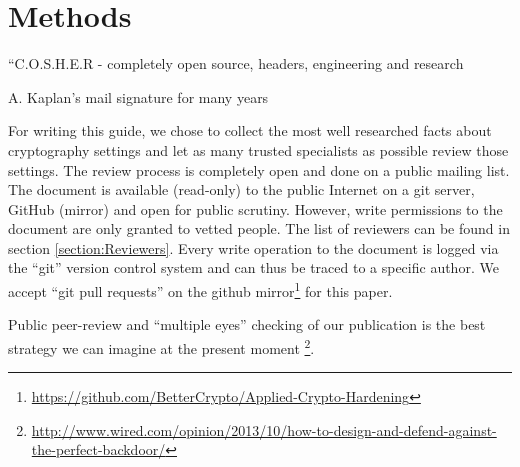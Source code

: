 \section{Methods}
\label{section:Methods}

\epigraph{``C.O.S.H.E.R - completely open source, headers, engineering and research}{A. Kaplan's mail signature for many years}

For writing this guide, we chose to collect the most well researched facts
about cryptography settings and let as many trusted specialists as possible
review those settings.  The review process is completely open and done on a
public mailing list. The document is available (read-only) to the public
Internet on a git server, GitHub (mirror) and open for public scrutiny.
However, write permissions to the document are only granted to vetted people.
The list of reviewers can be found in section \ref{section:Reviewers}.  Every
write operation to the document is logged via the ``git'' version control
system and can thus be traced to a specific author.  We accept ``git pull
requests'' on the github
mirror\footnote{\url{https://github.com/BetterCrypto/Applied-Crypto-Hardening}}
for this paper.

Public peer-review and ``multiple eyes'' checking of our publication is the
best strategy we can imagine at the present moment
\footnote{\url{http://www.wired.com/opinion/2013/10/how-to-design-and-defend-against-the-perfect-backdoor/}}.

